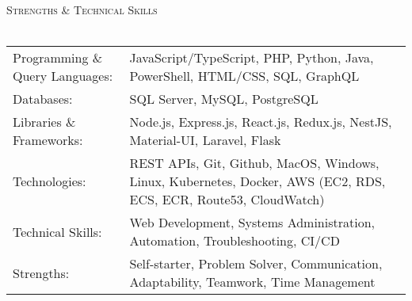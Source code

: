 \documentclass[letterpaper]{article}
\newcommand{\lineunder} {
    \vspace*{-8pt} \\
    \hspace*{-18pt} \hrulefill \\
}
\newcommand{\header} [1] {
    {\hspace*{-18pt}\vspace*{6pt} \textsc{#1}}
    \vspace*{-6pt} \lineunder
}
\begin{document}
\header{Strengths \& Technical Skills}
\begin{tabular}{ l p{} }
	Programming \& Query Languages: & JavaScript/TypeScript, PHP, Python, Java, PowerShell, HTML/CSS, SQL, GraphQL \\
    Databases:                       & SQL Server, MySQL, PostgreSQL \\
    Libraries \& Frameworks:         & Node.js, Express.js, React.js, Redux.js, NestJS, Material-UI, Laravel, Flask \\
	Technologies:                   & REST APIs, Git, Github, MacOS, Windows, Linux, Kubernetes, Docker, AWS (EC2, RDS, ECS, ECR, Route53, CloudWatch) \\
    Technical Skills:              & Web Development, Systems Administration, Automation, Troubleshooting, CI/CD \\
    Strengths:                      & Self-starter, Problem Solver, Communication, Adaptability, Teamwork, Time Management \\
\end{tabular}
\vspace{2mm}


\
\end{document}
